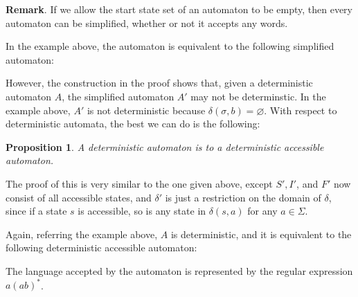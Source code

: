 \documentclass[12pt]{article}
\newtheorem{prop}{Proposition}
\begin{document}
\textbf{Remark}.  If we allow the start state set of an automaton to be empty, then every automaton can be simplified, whether or not it accepts any words.

In the example above, the automaton is equivalent to the following simplified automaton:

\begin{figure}[!h]
\centering
{}
\end{figure}

However, the construction in the proof shows that, given a deterministic automaton $A$, the simplified automaton $A'$ may not be determinstic.  In the example above, $A'$ is not deterministic because $\delta(\sigma,b)=\varnothing$.  With respect to deterministic automata, the best we can do is the following:

\begin{prop} A deterministic automaton is  to a deterministic accessible automaton.  \end{prop}
The proof of this is very similar to the one given above, except $S',I'$, and $F'$ now consist of all accessible states, and $\delta'$ is just a restriction on the domain of $\delta$, since if a state $s$ is accessible, so is any state in $\delta(s,a)$ for any $a\in \Sigma$.

Again, referring the example above, $A$ is deterministic, and it is equivalent to the following deterministic accessible automaton:

\begin{figure}[!h]
\centering
{}
\end{figure}

The language accepted by the automaton is represented by the regular expression $a(ab)^*$.
\end{document}
